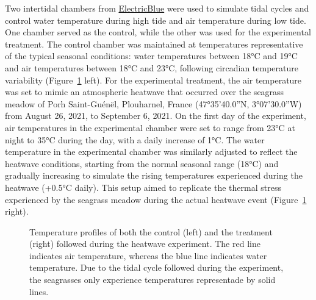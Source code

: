 \documentclass[
  number]{elsarticle}
\begin{document}
Two intertidal chambers from
\href{https://electricblue.eu/intertidal-chamber}{ElectricBlue} were
used to simulate tidal cycles and control water temperature during high
tide and air temperature during low tide. One chamber served as the
control, while the other was used for the experimental treatment. The
control chamber was maintained at temperatures representative of the
typical seasonal conditions: water temperatures between 18°C and 19°C
and air temperatures between 18°C and 23°C, following circadian
temperature variability (Figure~\ref{fig-Profile} left). For the
experimental treatment, the air temperature was set to mimic an
atmospheric heatwave that occurred over the seagrass meadow of Porh
Saint-Guénël, Plouharnel, France (47°35'40.0''N, 3°07'30.0''W) from
August 26, 2021, to September 6, 2021. On the first day of the
experiment, air temperatures in the experimental chamber were set to
range from 23°C at night to 35°C during the day, with a daily increase
of 1°C. The water temperature in the experimental chamber was similarly
adjusted to reflect the heatwave conditions, starting from the normal
seasonal range (18°C) and gradually increasing to simulate the rising
temperatures experienced during the heatwave (+0.5°C daily). This setup
aimed to replicate the thermal stress experienced by the seagrass meadow
during the actual heatwave event (Figure~\ref{fig-Profile} right).

\label{cell-fig-Profile}
\begin{figure}[H]


\caption{\label{fig-Profile}Temperature profiles of both the control
(left) and the treatment (right) followed during the heatwave
experiment. The red line indicates air temperature, whereas the blue
line indicates water temperature. Due to the tidal cycle followed during
the experiment, the seagrasses only experience temperatures representade
by solid lines.}

\end{figure}%
\end{document}
